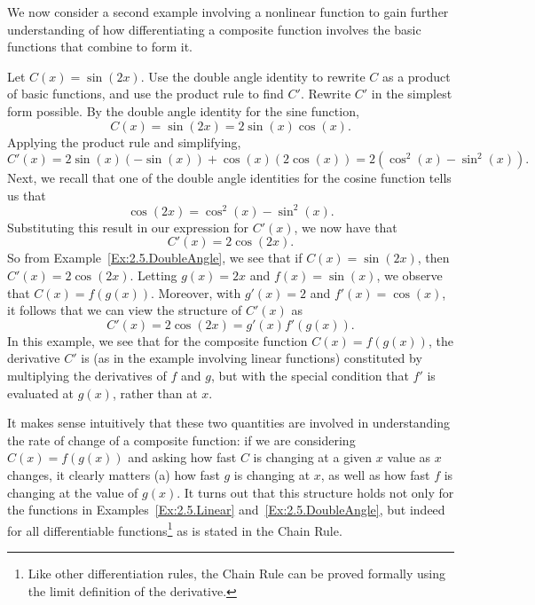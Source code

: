 We now consider a second example involving a nonlinear function to gain further understanding of how differentiating a composite function involves the basic functions that combine to form it.

\bex \label{Ex:2.5.DoubleAngle}
Let $C(x) = \sin(2x).$  Use the double angle identity to rewrite $C$ as a product of basic functions, and use the product rule to find $C'$.  Rewrite $C'$ in the simplest form possible.  
\eex
By the double angle identity for the sine function,
$$C(x) = \sin(2x) = 2\sin(x)\cos(x).$$
Applying the product rule and simplifying,
$$C'(x) = 2\sin(x)(-\sin(x)) + \cos(x)(2\cos(x)) = 2(\cos^2(x) - \sin^2(x)).$$
Next, we recall that one of the double angle identities for the cosine function tells us that 
$$\cos(2x) = \cos^2(x) - \sin^2(x).$$
Substituting this result in our expression for $C'(x)$, we now have that
$$C'(x) = 2 \cos(2x).$$
\afterex
So from Example~\ref{Ex:2.5.DoubleAngle}, we see that if $C(x) = \sin(2x)$, then $C'(x) = 2\cos(2x)$.  Letting $g(x) = 2x$ and $f(x) = \sin(x)$, we observe that $C(x) = f(g(x))$.  Moreover, with $g'(x) = 2$ and $f'(x) = \cos(x)$, it follows that we can view the structure of $C'(x)$ as
$$C'(x) = 2\cos(2x) = g'(x) f'(g(x)).$$
In this example, we see that for the composite function $C(x) = f(g(x))$, the derivative $C'$ is (as in the example involving linear functions) constituted by multiplying the derivatives of $f$ and $g$, but with the special condition that $f'$ is evaluated at $g(x)$, rather than at $x$.

It makes sense intuitively that these two quantities are involved in understanding the rate of change of a composite function:  if we are considering $C(x) = f(g(x))$ and asking how fast $C$ is changing at a given $x$ value as $x$ changes, it clearly matters (a) how fast $g$ is changing at $x$, as well as how fast $f$ is changing at the value of $g(x)$.  It turns out that this structure holds not only for the functions in Examples~\ref{Ex:2.5.Linear} and~\ref{Ex:2.5.DoubleAngle}, but indeed for all differentiable functions\footnote{Like other differentiation rules, the Chain Rule can be proved formally using the limit definition of the derivative.} as is stated in the Chain Rule.

\vspace*{5pt}
\nin {}
\vspace*{1pt}

